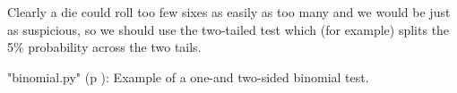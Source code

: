 Clearly a die could roll too few sixes as easily as too many and we would be just as suspicious, so we should use the two-tailed test which (for example) splits the 5\% probability across the two tails.

\PyImg "binomial.py" (p \pageref{py:binomial}): Example of a one-and two-sided binomial test.
